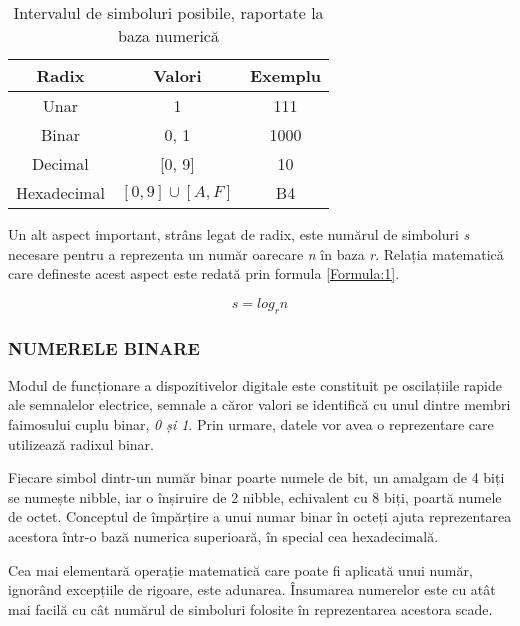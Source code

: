\documentclass[12pt]{article}
\begin{document}
\begin{table}[h]
\centering
\caption{Intervalul de simboluri posibile, raportate la baza numerică }
\label{Tabela:1}
\begin{tabular}{ ||c|c|c|| }
 \hline
 Radix & Valori & Exemplu \\ 
 \hline  \hline
 Unar & 1 & 111\\
 \hline
 Binar & 0, 1 & 1000\\ 
 \hline
 Decimal & [0, 9]  & 10\\ 
 \hline 
 Hexadecimal & $[0, 9] \cup [A, F]$ & B4\\ 
 \hline
\end{tabular}
\end{table}

Un alt aspect important, strâns legat de radix, este numărul de simboluri \textit{s} necesare pentru a reprezenta un număr oarecare \textit{n} în baza \textit{r}. Relația matematică care defineste acest aspect este redată prin formula \ref{Formula:1}.

\begin{equation}
\label{Formula:1}
s = log_r n
\end{equation}


\subsubsection{NUMERELE BINARE}
Modul de funcționare a dispozitivelor digitale  este constituit pe oscilațiile rapide ale semnalelor electrice, semnale a căror valori se identifică cu unul dintre membri faimosului cuplu binar, \textit{0 și 1}. Prin urmare, datele vor avea o reprezentare care utilizează radixul binar. 

Fiecare simbol dintr-un număr binar poarte numele de bit, un amalgam de 4 biți se numește nibble, iar o înșiruire de 2 nibble, echivalent cu 8 biți, poartă numele de octet. Conceptul de împărțire a unui numar binar în octeți ajuta reprezentarea acestora într-o bază numerica superioară, în special cea hexadecimală.


Cea mai elementară operație matematică care poate fi aplicată unui număr, ignorând excepțiile de rigoare, este adunarea. Însumarea numerelor este cu atât mai facilă cu cât numărul de simboluri folosite în reprezentarea acestora scade.
\bigbreak
\end{document}
